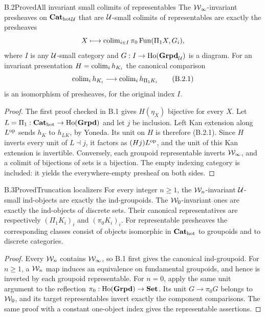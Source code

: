 \begin{claim}{B.2}{Proved}{All invariant small colimits of representables}
The $\mathcal W_\infty$-invariant presheaves on ${\mathbf{Cat}_{\mathrm{hot}}}_\mathcal U$ that are $\mathcal U$-small colimits of representables are exactly the presheaves
\[
 X\longmapsto\operatorname{colim}_{i\in I}\pi_0\operatorname{Fun}(\Pi_1X,G_i),
\]
where $I$ is any $\mathcal U$-small category and $G:I\to\operatorname{Ho}(\mathbf{Grpd}_\mathcal U)$ is a diagram. For an invariant presentation $H=\operatorname{colim}_i h_{K_i}$ the canonical comparison
\[
 \operatorname{colim}_i h_{K_i}\longrightarrow\operatorname{colim}_i h_{\Pi_1K_i} \tag{B.2.1}
\]
is an isomorphism of presheaves, for the original index $I$.
\end{claim}
\begin{proof}
The first proof checked in B.1 gives $H(\eta_X)$ bijective for every $X$. Let $L=\Pi_1:{\mathbf{Cat}_{\mathrm{hot}}}\to\operatorname{Ho}(\mathbf{Grpd})$ and let $j$ be inclusion. Left Kan extension along $L^{\mathrm{op}}$ sends $h_K$ to $h_{LK}$, by Yoneda. Its unit on $H$ is therefore (B.2.1). Since $H$ inverts every unit of $L\dashv j$, it factors as $(Hj)L^{\mathrm{op}}$, and the unit of this Kan extension is invertible. Conversely, each groupoid representable inverts $\mathcal W_\infty$, and a colimit of bijections of sets is a bijection. The empty indexing category is included: it yields the everywhere-empty presheaf on both sides.
\end{proof}

\begin{claim}{B.3}{Proved}{Truncation localizers}
For every integer $n\geq1$, the $\mathcal W_n$-invariant $\mathcal U$-small ind-objects are exactly the ind-groupoids. The $\mathcal W_0$-invariant ones are exactly the ind-objects of discrete sets. Their canonical representatives are respectively $(\Pi_1K_i)_i$ and $(\pi_0K_i)_i$. For representable presheaves the corresponding classes consist of objects isomorphic in ${\mathbf{Cat}_{\mathrm{hot}}}$ to groupoids and to discrete categories.
\end{claim}
\begin{proof}
Every $\mathcal W_n$ contains $\mathcal W_\infty$, so B.1 first gives the canonical ind-groupoid. For $n\geq1$, a $\mathcal W_n$ map induces an equivalence on fundamental groupoids, and hence is inverted by each groupoid representable. For $n=0$, apply the same unit argument to the reflection $\pi_0:\operatorname{Ho}(\mathbf{Grpd})\to\mathbf{Set}$. Its unit $G\to\pi_0G$ belongs to $\mathcal W_0$, and its target representables invert exactly the component comparisons. The same proof with a constant one-object index gives the representable assertions.
\end{proof}

